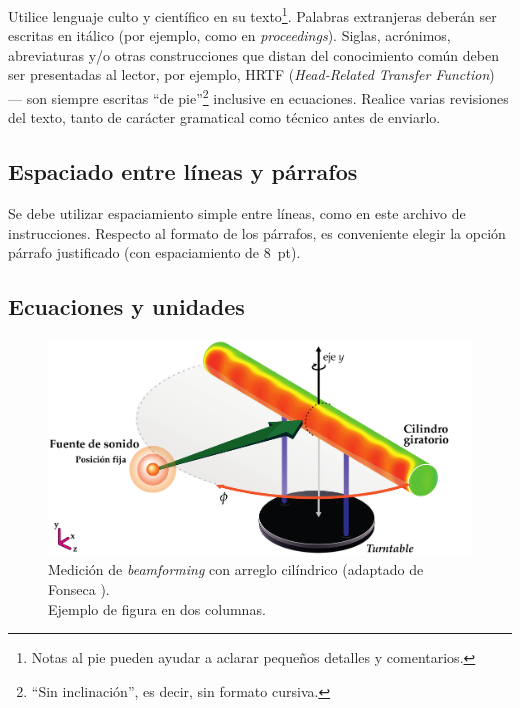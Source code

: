 \documentclass[12pt, a4paper, twoside, twocolumn]{article}
\begin{document}

Utilice lenguaje culto y científico en su texto\footnote{Notas al pie pueden ayudar a aclarar pequeños detalles y comentarios.}. Palabras extranjeras deberán ser escritas en itálico (por ejemplo, como en \textit{proceedings}). Siglas, acrónimos, abreviaturas y/o otras construcciones que distan del conocimiento común deben ser presentadas al lector, por ejemplo, HRTF (\textit{Head-Related Transfer Function}) --- son siempre escritas  ``de pie''\footnote{``Sin inclinación'', es decir, sin formato cursiva.} inclusive en ecuaciones. Realice varias revisiones del texto, tanto de carácter gramatical como técnico antes de enviarlo.

\subsection{Espaciado entre líneas y párrafos}

Se debe utilizar espaciamiento simple entre líneas, como en este archivo de instrucciones.
Respecto al formato de los párrafos, es conveniente elegir la opción párrafo justificado (con espaciamiento de 8~pt).


\subsection{Ecuaciones y unidades}

\begin{figure}[!ht] %
	\centering
	\includegraphics[width=0.74\linewidth]{figs/Measurement-Scheme-Fonseca-2013-sp.pdf}%
	\caption{Medición de \textit{beamforming} con arreglo cilíndrico (adaptado de Fonseca \cite{Fonseca-2013}).\\ Ejemplo de figura en dos columnas.}%
	\label{fig:beamforming}%
\end{figure}
\end{document}
